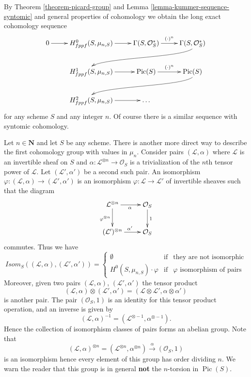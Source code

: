 \documentclass[10pt,a4paper]{amsart}
\theoremstyle{plain}
\theoremstyle{definition}
\theoremstyle{remark}
\numberwithin{equation}{subsection}
\def\Pic{\mathop{\mathrm{Pic}}\nolimits}
\begin{document}
\noindent
By
Theorem \ref{theorem-picard-group}
and
Lemma \ref{lemma-kummer-sequence-syntomic}
and general properties of cohomology we obtain
the long exact cohomology sequence
$$
\xymatrix{
0 \ar[r] &
H_{fppf}^0(S, \mu_{n, S}) \ar[r] &
\Gamma(S, \mathcal{O}_S^*) \ar[r]^{(\cdot)^n} &
\Gamma(S, \mathcal{O}_S^*) \ar@(rd, ul)[rdllllr]
\\
& H_{fppf}^1(S, \mu_{n, S}) \ar[r] &
\Pic(S) \ar[r]^{(\cdot)^n} &
\Pic(S) \ar@(rd, ul)[rdllllr] \\
& H_{fppf}^2(S, \mu_{n, S}) \ar[r] &
\ldots
}
$$
for any scheme $S$ and any integer $n$. Of course there is a similar sequence
with syntomic cohomology.

\medskip\noindent
Let $n \in \mathbf{N}$ and let $S$ be any scheme.
There is another more direct way to describe the first cohomology group with
values in $\mu_n$. Consider pairs
$(\mathcal{L}, \alpha)$ where $\mathcal{L}$ is an invertible sheaf on $S$
and $\alpha : \mathcal{L}^{\otimes n} \to \mathcal{O}_S$ is a trivialization
of the $n$th tensor power of $\mathcal{L}$.
Let $(\mathcal{L}', \alpha')$ be a second such pair.
An isomorphism $\varphi : (\mathcal{L}, \alpha) \to (\mathcal{L}', \alpha')$
is an isomorphism $\varphi : \mathcal{L} \to \mathcal{L}'$ of invertible
sheaves such that the diagram
$$
\xymatrix{
\mathcal{L}^{\otimes n} \ar[d]_{\varphi^{\otimes n}} \ar[r]_\alpha &
\mathcal{O}_S \ar[d]^1 \\
(\mathcal{L}')^{\otimes n} \ar[r]^{\alpha'} &
\mathcal{O}_S \\
}
$$
commutes. Thus we have
\begin{equation}
\label{equation-isomorphisms-pairs}
\mathit{Isom}_S((\mathcal{L}, \alpha), (\mathcal{L}', \alpha'))
=
\left\{
\begin{matrix}
\emptyset & \text{if} & \text{they are not isomorphic} \\
H^0(S, \mu_{n, S})\cdot \varphi & \text{if} &
\varphi \text{ isomorphism of pairs}
\end{matrix}
\right.
\end{equation}
Moreover, given two pairs $(\mathcal{L}, \alpha)$, $(\mathcal{L}', \alpha')$
the tensor product
$$
(\mathcal{L}, \alpha) \otimes (\mathcal{L}', \alpha')
=
(\mathcal{L} \otimes \mathcal{L}', \alpha \otimes \alpha')
$$
is another pair. The pair $(\mathcal{O}_S, 1)$ is an identity for this
tensor product operation, and an inverse is given by
$$
(\mathcal{L}, \alpha)^{-1} = (\mathcal{L}^{\otimes -1}, \alpha^{\otimes -1}).
$$
Hence the collection of isomorphism classes of pairs forms an abelian group.
Note that
$$
(\mathcal{L}, \alpha)^{\otimes n}
=
(\mathcal{L}^{\otimes n}, \alpha^{\otimes n})
\xrightarrow{\alpha}
(\mathcal{O}_S, 1)
$$
is an isomorphism
hence every element of this group has order dividing $n$. We warn the reader
that this group is in general {\bf not} the $n$-torsion in $\Pic(S)$.
\end{document}
